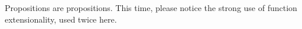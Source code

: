 \begin{code}
\\
%
\>[2]\AgdaSpace{}%
\AgdaSpace{}%
\AgdaSpace{}%
\AgdaSpace{}%
\AgdaSymbol{(}\AgdaSpace{}%
\AgdaSymbol{)}\AgdaSpace{}%
\AgdaSymbol{(}\AgdaSpace{}%
\AgdaSymbol{)}\AgdaSpace{}%
\AgdaSymbol{=}\AgdaSpace{}%
\AgdaSpace{}%
\AgdaSymbol{(}\AgdaSpace{}%
\AgdaSymbol{(}\AgdaSpace{}%
\AgdaOperator{\AgdaInductiveConstructor{,}}\AgdaSpace{}%
\AgdaSymbol{))}\<%
\\
%
\>[2]\AgdaSpace{}%
\AgdaSpace{}%
\AgdaSpace{}%
\AgdaSpace{}%
\AgdaSymbol{(}\AgdaSpace{}%
\AgdaSymbol{)}\AgdaSpace{}%
\AgdaSymbol{(}\AgdaSpace{}%
\AgdaSymbol{)}\AgdaSpace{}%
\AgdaSymbol{=}\AgdaSpace{}%
\AgdaSpace{}%
\AgdaSpace{}%
\AgdaSymbol{(}\AgdaSpace{}%
\AgdaSpace{}%
\AgdaSymbol{)}\<%
\end{code}

Propositions are propositions. This time, please notice
the strong use of function extensionality, used twice here.

